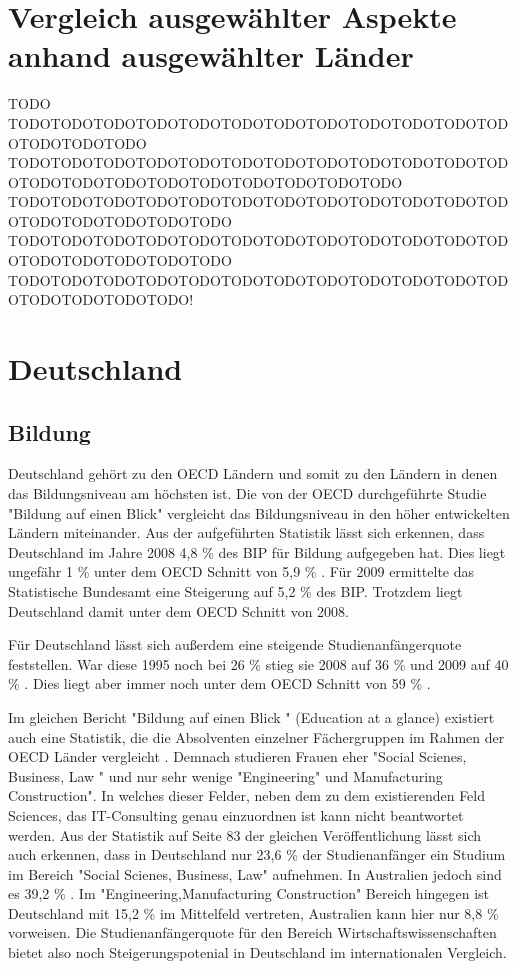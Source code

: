 \section{Vergleich ausgewählter Aspekte anhand ausgewählter Länder}
TODO TODOTODOTODOTODOTODOTODOTODOTODOTODOTODOTODOTODOTODOTODOTODO
TODOTODOTODOTODOTODOTODOTODOTODOTODOTODOTODOTODOTODOTODOTODOTODOTODOTODOTODOTODOTODO
TODOTODOTODOTODOTODOTODOTODOTODOTODOTODOTODOTODOTODOTODOTODOTODOTODO
TODOTODOTODOTODOTODOTODOTODOTODOTODOTODOTODOTODOTODOTODOTODOTODOTODO
TODOTODOTODOTODOTODOTODOTODOTODOTODOTODOTODOTODOTODOTODOTODOTODO!

\section{Deutschland}
\subsection{Bildung}
Deutschland gehört zu den OECD Ländern und somit zu den Ländern in denen das Bildungsniveau am höchsten ist. Die von der OECD durchgeführte Studie "Bildung auf einen Blick" \cite{oecd2} vergleicht das Bildungsniveau in den höher entwickelten Ländern miteinander. Aus der aufgeführten Statistik lässt sich erkennen, dass Deutschland im Jahre 2008 4,8 \% des BIP für Bildung aufgegeben hat. Dies liegt ungefähr 1 \% unter dem OECD Schnitt von 5,9 \% . Für 2009 ermittelte das Statistische Bundesamt eine Steigerung auf 5,2 \% des BIP. Trotzdem liegt Deutschland damit unter dem OECD Schnitt von 2008.

Für Deutschland lässt sich außerdem eine steigende Studienanfängerquote feststellen. War diese 1995 noch bei 26 \%  stieg sie 2008 auf 36 \%  und 2009 auf 40 \% . Dies liegt aber immer noch unter dem OECD Schnitt von 59 \% .

Im gleichen Bericht "Bildung auf einen Blick " (Education at a glance) existiert auch eine Statistik, die die Absolventen einzelner Fächergruppen im Rahmen der OECD Länder vergleicht \cite{oecd3}. Demnach studieren Frauen eher "Social Scienes, Business, Law " und nur sehr wenige "Engineering" und Manufacturing Construction". In welches dieser Felder, neben dem  zu dem existierenden Feld Sciences, das IT-Consulting genau einzuordnen ist kann nicht beantwortet werden. Aus der Statistik auf Seite 83 der gleichen Veröffentlichung lässt sich auch erkennen, dass in Deutschland nur 23,6 \% der Studienanfänger ein Studium im Bereich "Social Scienes, Business, Law" aufnehmen. In Australien jedoch sind es 39,2 \% . Im "Engineering,Manufacturing Construction" Bereich hingegen ist Deutschland mit 15,2 \% im Mittelfeld vertreten, Australien kann hier nur  8,8 \% vorweisen. Die Studienanfängerquote für den Bereich Wirtschaftswissenschaften bietet also noch Steigerungspotenial in Deutschland im internationalen Vergleich.

